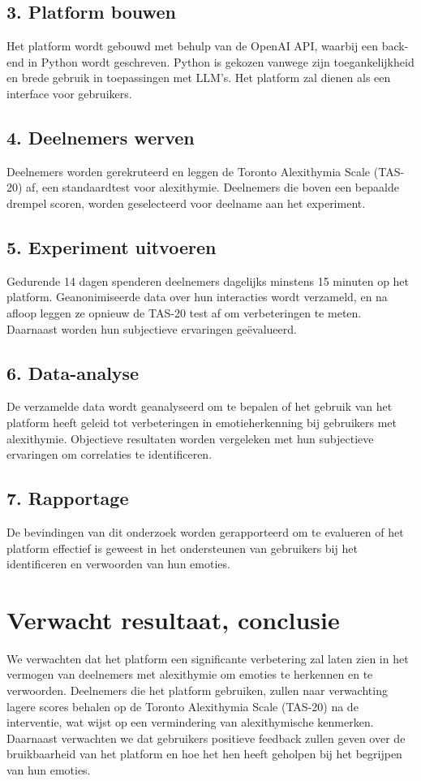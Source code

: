 \subsection{3. Platform bouwen}
Het platform wordt gebouwd met behulp van de OpenAI API, waarbij een back-end in Python wordt geschreven. Python is gekozen vanwege zijn toegankelijkheid en brede gebruik in toepassingen met LLM's. Het platform zal dienen als een interface voor gebruikers.

\subsection{4. Deelnemers werven}
Deelnemers worden gerekruteerd en leggen de Toronto Alexithymia Scale (TAS-20) af, een standaardtest voor alexithymie. Deelnemers die boven een bepaalde drempel scoren, worden geselecteerd voor deelname aan het experiment.

\subsection{5. Experiment uitvoeren}
Gedurende 14 dagen spenderen deelnemers dagelijks minstens 15 minuten op het platform. Geanonimiseerde data over hun interacties wordt verzameld, en na afloop leggen ze opnieuw de TAS-20 test af om verbeteringen te meten. Daarnaast worden hun subjectieve ervaringen geëvalueerd.

\subsection{6. Data-analyse}
De verzamelde data wordt geanalyseerd om te bepalen of het gebruik van het platform heeft geleid tot verbeteringen in emotieherkenning bij gebruikers met alexithymie. Objectieve resultaten worden vergeleken met hun subjectieve ervaringen om correlaties te identificeren.

\subsection{7. Rapportage}
De bevindingen van dit onderzoek worden gerapporteerd om te evalueren of het platform effectief is geweest in het ondersteunen van gebruikers bij het identificeren en verwoorden van hun emoties.

\section{Verwacht resultaat, conclusie}%
\label{sec:verwachte_resultaten}

We verwachten dat het platform een significante verbetering zal laten zien in het vermogen van deelnemers met alexithymie om emoties te herkennen en te verwoorden. Deelnemers die het platform gebruiken, zullen naar verwachting lagere scores behalen op de Toronto Alexithymia Scale (TAS-20) na de interventie, wat wijst op een vermindering van alexithymische kenmerken. Daarnaast verwachten we dat gebruikers positieve feedback zullen geven over de bruikbaarheid van het platform en hoe het hen heeft geholpen bij het begrijpen van hun emoties.

